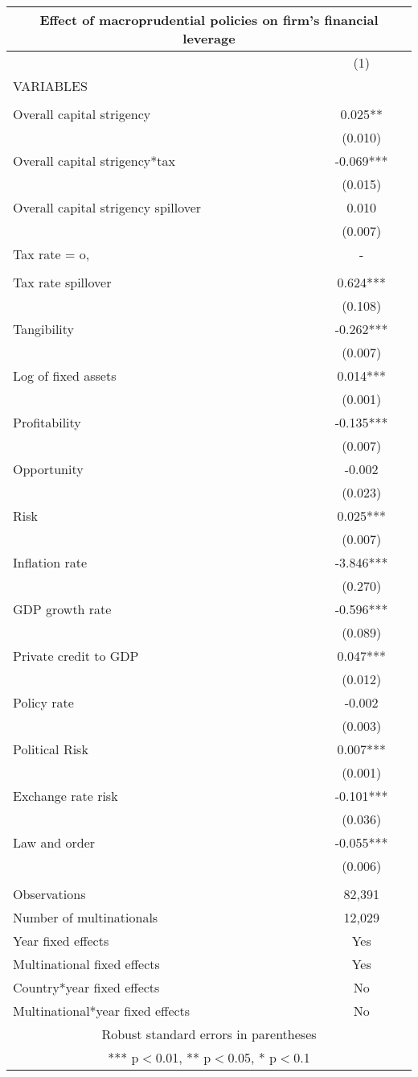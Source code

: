 \begin{tabular}{lc}
\multicolumn{2}{c}{Effect of macroprudential policies on firm's financial leverage} \\ \hline
 & (1) \\
VARIABLES &  \\ \hline
 &  \\
Overall capital strigency & 0.025** \\
 & (0.010) \\
Overall capital strigency*tax & -0.069*** \\
 & (0.015) \\
Overall capital strigency spillover & 0.010 \\
 & (0.007) \\
Tax rate = o, & - \\
 &  \\
Tax rate spillover & 0.624*** \\
 & (0.108) \\
Tangibility & -0.262*** \\
 & (0.007) \\
Log of fixed assets & 0.014*** \\
 & (0.001) \\
Profitability & -0.135*** \\
 & (0.007) \\
Opportunity & -0.002 \\
 & (0.023) \\
Risk & 0.025*** \\
 & (0.007) \\
Inflation rate & -3.846*** \\
 & (0.270) \\
GDP growth rate & -0.596*** \\
 & (0.089) \\
Private credit to GDP & 0.047*** \\
 & (0.012) \\
Policy rate & -0.002 \\
 & (0.003) \\
Political Risk & 0.007*** \\
 & (0.001) \\
Exchange rate risk & -0.101*** \\
 & (0.036) \\
Law and order & -0.055*** \\
 & (0.006) \\
 &  \\
Observations & 82,391 \\
Number of multinationals & 12,029 \\
Year fixed effects & Yes \\
Multinational fixed effects & Yes \\
Country*year fixed effects & No \\
 Multinational*year fixed effects & No \\ \hline
\multicolumn{2}{c}{ Robust standard errors in parentheses} \\
\multicolumn{2}{c}{ *** p$<$0.01, ** p$<$0.05, * p$<$0.1} \\
\end{tabular}
